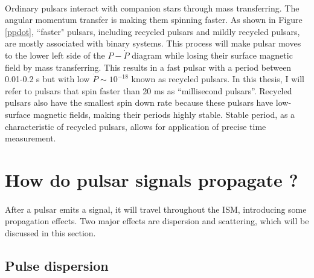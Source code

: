 \documentclass[thesis_msc.tex]{subfiles}
\begin{document}
\paragraph{} Ordinary pulsars interact with companion stars through mass transferring.  The angular momentum transfer is making them spinning faster. As shown in Figure \ref{ppdot}, ``faster" pulsars, including recycled pulsars and mildly recycled pulsars, are mostly associated with binary systems. This process will make pulsar moves to the lower left side of the $P-\dot{P}$ diagram while losing their surface magnetic field by mass transferring. This results in a fast pulsar with a period between 0.01-0.2 s but with low $\dot{P} \sim 10^{-18}$ known as recycled pulsars. In this thesis, I will refer to pulsars that spin faster than 20 ms as ``millisecond pulsars''. Recycled pulsars also have the smallest spin down rate because these pulsars have low-surface magnetic fields, making their periods highly stable. Stable period, as a characteristic of recycled pulsars, allows for application of precise time measurement.  

 \section{How do pulsar signals propagate ?}
 \paragraph{} After a pulsar emits a signal, it will travel throughout the ISM, introducing some propagation effects. Two major effects are dispersion and scattering, which will be discussed in this section.   
    \subsection{Pulse dispersion} \label{Pulse_dispersion}
\end{document}
